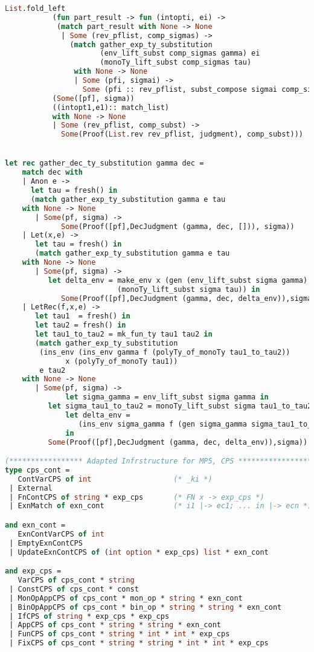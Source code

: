\begin{lstlisting}[language=Caml, caption=definitions.ml]
           List.fold_left
           (fun part_result -> fun (intopti, ei) ->
            (match part_result with None -> None
             | Some (rev_pflist, comp_sigmas) ->
               (match gather_exp_ty_substitution
                      (env_lift_subst comp_sigmas gamma) ei
                      (monoTy_lift_subst comp_sigmas tau)
                with None -> None
                | Some (pfi, sigmai) ->
                  Some (pfi :: rev_pflist, subst_compose sigmai comp_sigmas))))
           (Some([pf], sigma))
           ((intopt1,e1):: match_list)
           with None -> None
           | Some (rev_pflist, comp_subst) ->
             Some(Proof(List.rev rev_pflist, judgment), comp_subst)))


let rec gather_dec_ty_substitution gamma dec =
    match dec with 
    | Anon e ->
      let tau = fresh() in
      (match gather_exp_ty_substitution gamma e tau
	with None -> None
	   | Some(pf, sigma) ->
             Some(Proof([pf],DecJudgment (gamma, dec, [])), sigma))
    | Let(x,e) -> 
       let tau = fresh() in
       (match gather_exp_ty_substitution gamma e tau
	with None -> None
	   | Some(pf, sigma) -> 
	      let delta_env = make_env x (gen (env_lift_subst sigma gamma) 
					      (monoTy_lift_subst sigma tau)) in
             Some(Proof([pf],DecJudgment (gamma, dec, delta_env)),sigma))
    | LetRec(f,x,e) ->
       let tau1  = fresh() in
       let tau2 = fresh() in
       let tau1_to_tau2 = mk_fun_ty tau1 tau2 in
       (match gather_exp_ty_substitution
		(ins_env (ins_env gamma f (polyTy_of_monoTy tau1_to_tau2))
			  x (polyTy_of_monoTy tau1))
		e tau2
	with None -> None
	   | Some(pf, sigma) -> 
              let sigma_gamma = env_lift_subst sigma gamma in
	      let sigma_tau1_to_tau2 = monoTy_lift_subst sigma tau1_to_tau2 in
              let delta_env =
                 (ins_env sigma_gamma f (gen sigma_gamma sigma_tau1_to_tau2))
              in 
	      Some(Proof([pf],DecJudgment (gamma, dec, delta_env)),sigma))

(***************** Adapted Infrstructure for MP5, CPS *********************)
type cps_cont = 
   ContVarCPS of int                   (* _ki *)
 | External
 | FnContCPS of string * exp_cps       (* FN x -> exp_cps *)
 | ExnMatch of exn_cont                (* i1 |-> ec1; ... in |-> ecn *)

and exn_cont =
   ExnContVarCPS of int
 | EmptyExnContCPS
 | UpdateExnContCPS of (int option * exp_cps) list * exn_cont

and exp_cps =
   VarCPS of cps_cont * string
 | ConstCPS of cps_cont * const
 | MonOpAppCPS of cps_cont * mon_op * string * exn_cont
 | BinOpAppCPS of cps_cont * bin_op * string * string * exn_cont
 | IfCPS of string * exp_cps * exp_cps
 | AppCPS of cps_cont * string * string * exn_cont
 | FunCPS of cps_cont * string * int * int * exp_cps
 | FixCPS of cps_cont * string * string * int * int * exp_cps 


\end{lstlisting}
